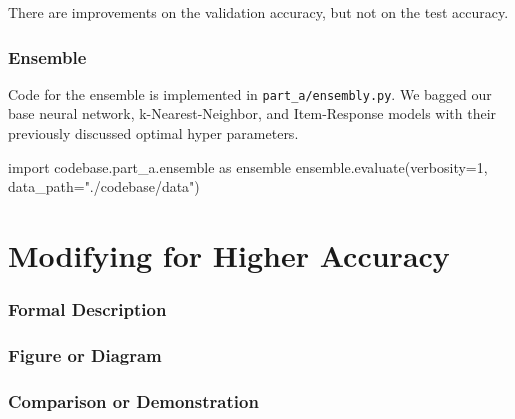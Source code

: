 \documentclass{article}
\begin{document}
    There are improvements on the validation accuracy, but not on the test accuracy.


    \pagebreak

    \section{Ensemble}
    Code for the ensemble is implemented in \verb|part_a/ensembly.py|. We bagged our base neural network, k-Nearest-Neighbor, and Item-Response models with their previously discussed optimal hyper parameters.

    \begin{pylabblock}[ENSEMBLE]
        import codebase.part_a.ensemble as ensemble
        ensemble.evaluate(verbosity=1, data_path="./codebase/data")
    \end{pylabblock}
    \printpythontex[verb]

    \pagebreak

    \part{Modifying for Higher Accuracy}
    \section{Formal Description}
    \section{Figure or Diagram}
    \section{Comparison or Demonstration}
\end{document}
